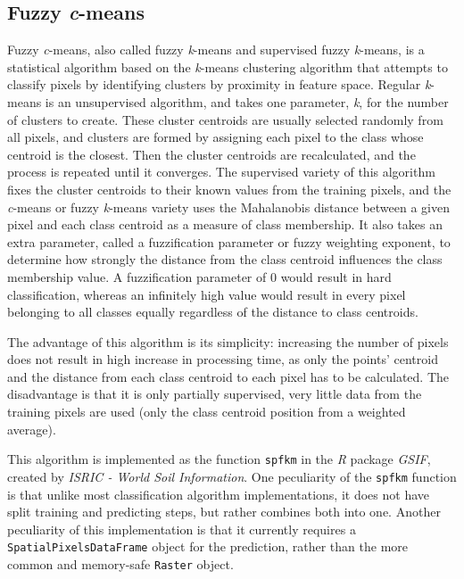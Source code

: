 \documentclass[a4paper,10pt]{book}
\begin{document}
\subsection{Fuzzy \textit{c}-means}

Fuzzy \textit{c}-means, also called fuzzy \textit{k}-means and supervised fuzzy \textit{k}-means, is a statistical algorithm based on the \textit{k}-means clustering algorithm that attempts to classify pixels by identifying clusters by proximity in feature space. Regular \textit{k}-means is an unsupervised algorithm, and takes one parameter, \textit{k}, for the number of clusters to create. These cluster centroids are usually selected randomly from all pixels, and clusters are formed by assigning each pixel to the class whose centroid is the closest. Then the cluster centroids are recalculated, and the process is repeated until it converges. The supervised variety of this algorithm fixes the cluster centroids to their known values from the training pixels, and the \textit{c}-means or fuzzy \textit{k}-means variety uses the Mahalanobis distance between a given pixel and each class centroid as a measure of class membership. It also takes an extra parameter, called a fuzzification parameter or fuzzy weighting exponent, to determine how strongly the distance from the class centroid influences the class membership value. A fuzzification parameter of 0 would result in hard classification, whereas an infinitely high value would result in every pixel belonging to all classes equally regardless of the distance to class centroids. \citep{hengl2004fuzzycmeans}

The advantage of this algorithm is its simplicity: increasing the number of pixels does not result in high increase in processing time, as only the points' centroid and the distance from each class centroid to each pixel has to be calculated. The disadvantage is that it is only partially supervised, very little data from the training pixels are used (only the class centroid position from a weighted average).

This algorithm is implemented as the function \texttt{spfkm} in the \textit{R} package \textit{GSIF}, created by \textit{ISRIC - World Soil Information}. One peculiarity of the \texttt{spfkm} function is that unlike most classification algorithm implementations, it does not have split training and predicting steps, but rather combines both into one. Another peculiarity of this implementation is that it currently requires a \texttt{SpatialPixelsDataFrame} object for the prediction, rather than the more common and memory-safe \texttt{Raster} object.
\end{document}
